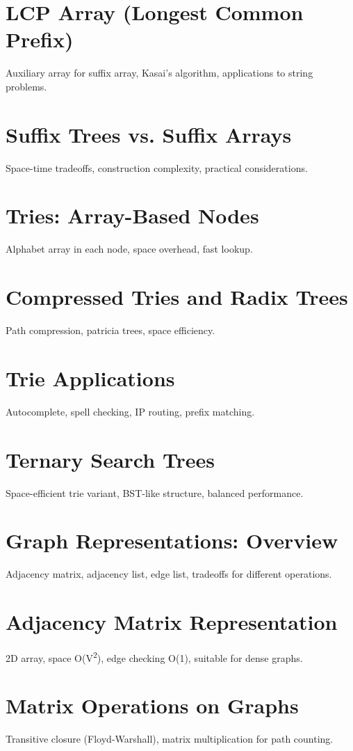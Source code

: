 \chapter{LCP Array (Longest Common Prefix)}
Auxiliary array for suffix array, Kasai's algorithm, applications to string problems.

\chapter{Suffix Trees vs. Suffix Arrays}
Space-time tradeoffs, construction complexity, practical considerations.

\chapter{Tries: Array-Based Nodes}
Alphabet array in each node, space overhead, fast lookup.

\chapter{Compressed Tries and Radix Trees}
Path compression, patricia trees, space efficiency.

\chapter{Trie Applications}
Autocomplete, spell checking, IP routing, prefix matching.

\chapter{Ternary Search Trees}
Space-efficient trie variant, BST-like structure, balanced performance.


\chapter{Graph Representations: Overview}
Adjacency matrix, adjacency list, edge list, tradeoffs for different operations.

\chapter{Adjacency Matrix Representation}
2D array, space O(V\textsuperscript{2}), edge checking O(1), suitable for dense graphs.

\chapter{Matrix Operations on Graphs}
Transitive closure (Floyd-Warshall), matrix multiplication for path counting.

